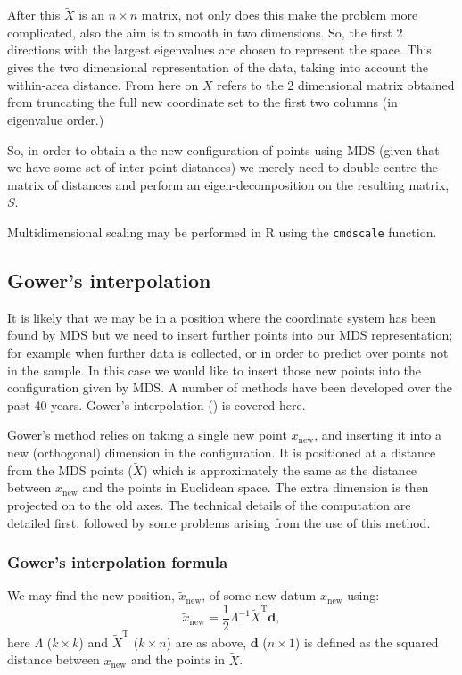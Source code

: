 \documentclass[a4paper,10pt]{article}
\newcommand{\tr}[1]{#1^{\text{T}}}
\newcommand{\cross}{\times}
\begin{document}
After this $\tilde{X}$ is an $n \cross n$ matrix, not only does this make the problem more complicated, also the aim is to smooth in two dimensions. So, the first 2 directions with the largest eigenvalues are chosen to represent the space. This gives the two dimensional representation of the data, taking into account the within-area distance. From here on $\tilde{X}$ refers to the 2 dimensional matrix obtained from truncating the full new coordinate set to the first two columns (in eigenvalue order.)

So, in order to obtain a the new configuration of points using MDS (given that we have some set of inter-point distances) we merely need to double centre the matrix of distances and perform an eigen-decomposition on the resulting matrix, $S$. 

Multidimensional scaling may be performed in \textsf{R} using the \texttt{cmdscale} function. 

\subsection{Gower's interpolation} 

It is likely that we may be in a position where the coordinate system has been found by MDS but we need to insert further points into our MDS representation; for example when further data is collected, or in order to predict over points not in the sample. In this case we would like to insert those new points into the configuration given by MDS. A number of methods have been developed over the past 40 years. Gower's interpolation (\cite{gower1968}) is covered here.

Gower's method relies on taking a single new point $x_{\text{new}}$, and inserting it into a new (orthogonal) dimension in the configuration. It is positioned at a distance from the MDS points ($\tilde{X}$) which is approximately the same as the distance between $x_{\text{new}}$ and the points in Euclidean space. The extra dimension is then projected on to the old axes. The technical details of the computation are detailed first, followed by some problems arising from the use of this method. 

\subsubsection{Gower's interpolation formula}

We may find the new position, $\tilde{x}_{\text{new}}$, of some new datum $x_{\text{new}}$ using:
\begin{equation}
\tilde{x}_{\text{new}} = \frac{1}{2} \Lambda^{-1} \tr{\tilde{X}} \mathbf{d},
\label{gower}
\end{equation}
here $\Lambda$ ($k \cross k$) and $\tr{\tilde{X}}$ ($k \cross n$) are as above, $\mathbf{d}$ ($n \cross 1$) is defined as the squared distance between $x_{\text{new}}$ and the points in $\tilde{X}$.
\end{document}
